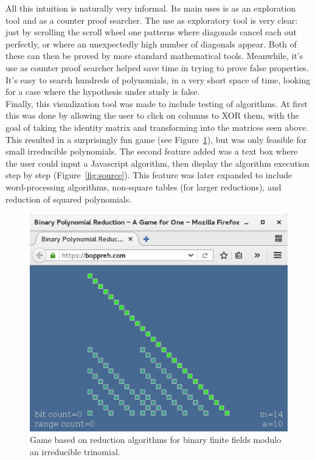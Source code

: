 All this intuition is naturally very informal. Its main uses is as an exploration tool and as a counter proof searcher. The use as exploratory tool is very clear: just by scrolling the scroll wheel one patterns where diagonals cancel each out perfectly, or where an unexpectedly high number of diagonals appear. Both of these can then be proved by more standard mathematical tools. Meanwhile, it's use as counter proof searcher helped save time in trying to prove false properties. It's easy to search hundreds of polynomials, in a very short space of time, looking for a case where the hypothesis under study is false. \\

Finally, this visualization tool was made to include testing of algorithms. At first this was done by allowing the user to click on columns to XOR them, with the goal of taking the identity matrix and transforming into the matrices seen above. This resulted in a surprisingly fun game (see Figure~\ref{fig:game}), but was only feasible for small irreducible polynomials. The second feature added was a text box where the user could input a Javascript algorithm, then display the algorithm execution step by step (Figure~\ref{fig:source}). This feature was later expanded to include word-processing algorithms, non-square tables (for larger reductions), and reduction of squared polynomials. \\

\begin{figure}
  \caption{Game based on reduction algorithms for binary finite fields modulo an irreducible trinomial.}
  \label{fig:game}
  \includegraphics[width = .55\columnwidth]{figures/boppreh.png}
\end{figure}

